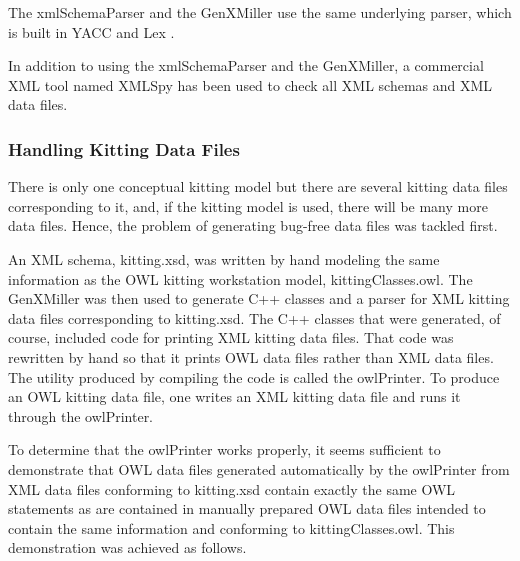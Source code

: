 The xmlSchemaParser and the GenXMiller use the same underlying parser,
which is built in YACC and Lex \cite{LexAndYACC}.

In addition to using the xmlSchemaParser and the GenXMiller, a commercial
XML tool named XMLSpy \cite{XMLSpyManual} has been used to check all XML
schemas and XML data files.\\

\subsubsection{Handling Kitting Data Files}

There is only one conceptual kitting model but there are several kitting
data files corresponding to it, and, if the kitting model is used, there
will be many more data files. Hence, the problem of generating bug-free
data files was tackled first.

An XML schema, kitting.xsd, was written by hand modeling the same
information as the OWL kitting workstation model, kittingClasses.owl. The
GenXMiller was then used to generate C++ classes and a parser for XML
kitting data files corresponding to kitting.xsd. The C++ classes that were
generated, of course, included code for printing XML kitting data
files. That code was rewritten by hand so that it prints OWL data files
rather than XML data files. The utility produced by compiling the code is
called the owlPrinter. To produce an OWL kitting data file, one writes an
XML kitting data file and runs it through the owlPrinter.

To determine that the owlPrinter works properly, it seems sufficient to
demonstrate that OWL data files generated automatically by the owlPrinter
from XML data files conforming to kitting.xsd contain exactly the same OWL
statements as are contained in manually prepared OWL data files intended to
contain the same information and conforming to kittingClasses.owl. This
demonstration was achieved as follows.


